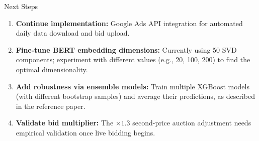 \documentclass[smaller]{beamer}
\begin{document}
\begin{frame}{Next Steps}

\begin{enumerate}
    \item \textbf{Continue implementation:} Google Ads API integration for automated daily data download and bid upload.

    \item \textbf{Fine-tune BERT embedding dimensions:} Currently using 50 SVD components; experiment with different values (e.g., 20, 100, 200) to find the optimal dimensionality.

    \item \textbf{Add robustness via ensemble models:} Train multiple XGBoost models (with different bootstrap samples) and average their predictions, as described in the reference paper.

    \item \textbf{Validate bid multiplier:} The $\times 1.3$ second-price auction adjustment needs empirical validation once live bidding begins.
\end{enumerate}

\end{frame}
\end{document}
